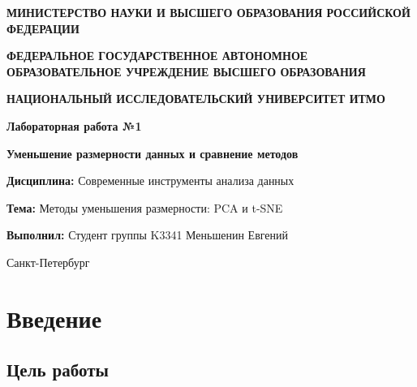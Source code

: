 \documentclass[12pt,a4paper]{report}
\begin{document}
\begin{titlepage}
    \centering
    \vspace*{1cm}
    
    {\Large\textbf{МИНИСТЕРСТВО НАУКИ И ВЫСШЕГО ОБРАЗОВАНИЯ РОССИЙСКОЙ ФЕДЕРАЦИИ}}
    
    \vspace{1cm}
    
    {\large\textbf{ФЕДЕРАЛЬНОЕ ГОСУДАРСТВЕННОЕ АВТОНОМНОЕ ОБРАЗОВАТЕЛЬНОЕ УЧРЕЖДЕНИЕ ВЫСШЕГО ОБРАЗОВАНИЯ}}
    
    \vspace{0.5cm}
    
    {\large\textbf{НАЦИОНАЛЬНЫЙ ИССЛЕДОВАТЕЛЬСКИЙ УНИВЕРСИТЕТ ИТМО}}
    
    \vspace{2cm}
    
    {\Large\textbf{Лабораторная работа №1}}
    
    \vspace{0.5cm}
    
    {\Large\textbf{Уменьшение размерности данных и сравнение методов}}
    
    \vspace{1cm}
    
    \begin{flushleft}
    \textbf{Дисциплина:} Современные инструменты анализа данных
    
    \textbf{Тема:} Методы уменьшения размерности: PCA и t-SNE
    
    \vspace{1cm}
    
    \textbf{Выполнил:} Студент группы K3341 Меньшенин Евгений
    
    \end{flushleft}
    
    \vfill
    
    {\large Санкт-Петербург \the\year}
    
\end{titlepage}

\tableofcontents
\newpage

\chapter{Введение}

\section{Цель работы}
\end{document}

